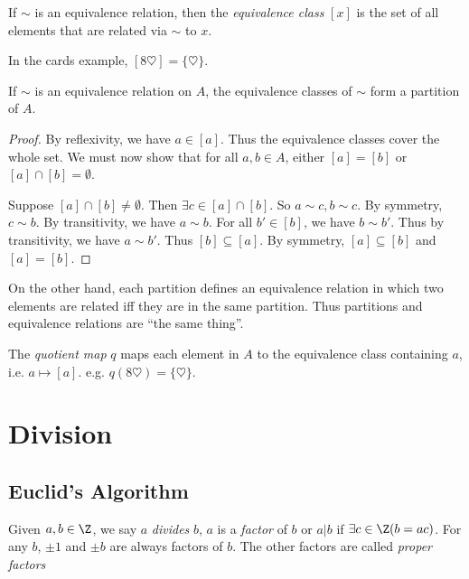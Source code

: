 \documentclass[a4paper]{article}
\begin{document}
  \begin{defi}
    If $\sim$ is an equivalence relation, then the \emph{equivalence class} $[x]$ is the set of all elements that are related via $\sim$ to $x$.
  \end{defi}

  \begin{eg}
    In the cards example, $[8\heartsuit] = \{\heartsuit\}$.
  \end{eg}

  \begin{thm}
    If $\sim$ is an equivalence relation on $A$, the equivalence classes of $\sim$ form a partition of $A$.
  \end{thm}

  \begin{proof}
    By reflexivity, we have $a\in [a]$. Thus the equivalence classes cover the whole set. We must now show that for all $a, b\in A$, either $[a] = [b]$ or $[a]\cap [b]=\emptyset$.

    Suppose $[a]\cap[b]\not=\emptyset$. Then $\exists c\in [a]\cap[b]$. So $a\sim c, b\sim c$. By symmetry, $c\sim b$. By transitivity, we have $a\sim b$. For all $b'\in [b]$, we have $b\sim b'$. Thus by transitivity, we have $a\sim b'$. Thus $[b]\subseteq[a]$. By symmetry, $[a]\subseteq[b]$  and $[a] = [b]$.
  \end{proof}

  On the other hand, each partition defines an equivalence relation in which two elements are related iff they are in the same partition. Thus partitions and equivalence relations are ``the same thing''.
  \begin{defi}
    The \emph{quotient map} $q$ maps each element in $A$ to the equivalence class containing $a$, i.e. $a\mapsto [a]$. e.g. $q(8\heartsuit) = \{\heartsuit\}$.
  \end{defi}

  \section{Division}
  \subsection{Euclid's Algorithm}
  \begin{defi}
    Given $a, b\in \Z$, we say $a$ \emph{divides} $b$, $a$ is a \emph{factor} of $b$ or $a|b$ if $\exists c\in \Z(b = ac)$. For any $b$, $\pm 1$ and $\pm b$ are always factors of $b$. The other factors are called \emph{proper factors}
  \end{defi}
\end{document}
